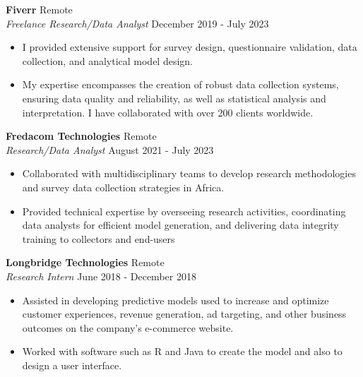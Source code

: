 \documentclass[a4paper,9pt]{extarticle}
\begin{document}
\noindent
\textbf{Fiverr} \hfill Remote \\ %
\textit{Freelance Research/Data Analyst} \hfill December 2019  - July 2023 %
\begin{itemize}[topsep=0pt, partopsep=0pt, itemsep=0pt, parsep=0pt]
\item I provided extensive support for survey design, questionnaire validation, data collection, and analytical model design.
\item My expertise encompasses the creation of robust data collection systems, ensuring data quality and reliability, as well as statistical analysis and interpretation. I have collaborated with over 200 clients worldwide. %
\end{itemize}

\noindent
\textbf{Fredacom Technologies} \hfill Remote \\ %
\textit{Research/Data Analyst} \hfill August 2021  - July 2023 %
\begin{itemize}[topsep=0pt, partopsep=0pt, itemsep=0pt, parsep=0pt]
\item Collaborated with multidisciplinary teams to develop research methodologies and survey data collection strategies in Africa.
\item Provided technical expertise by overseeing research activities, coordinating data analysts for efficient model generation, and delivering data integrity training to collectors and end-users %
\end{itemize}

\noindent
\textbf{Longbridge Technologies} \hfill Remote \\ %
\textit{Research Intern} \hfill June 2018  - December 2018 %
\begin{itemize}[topsep=0pt, partopsep=0pt, itemsep=0pt, parsep=0pt]
\item Assisted in developing predictive models used to increase and optimize customer experiences, revenue generation, ad targeting, and other business outcomes on the company's e-commerce website.
    \item Worked with software such as R and Java to create the model and also to design a user interface. %
\end{itemize}
\end{document}
